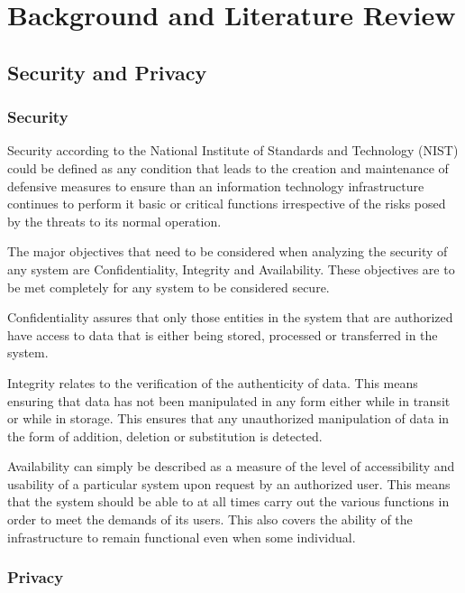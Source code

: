 \chapter{Background and Literature Review}
\label{chap:background_literature_review}

\section{Security and Privacy}

\subsection{Security}
Security according to the National Institute of Standards and Technology (NIST) \cite{Kissel2013} could be defined as any condition that leads to the creation and maintenance of defensive measures to ensure than an information technology infrastructure continues to perform it basic or critical functions irrespective of the risks posed by the threats to its normal operation.

The major objectives that need to be considered when analyzing the security of any system are Confidentiality, Integrity and Availability. These objectives are to be met completely for any system to be considered secure.

Confidentiality \cite{Kissel2013} assures that only those entities in the system that are authorized have access to data that is either being stored, processed or transferred in the system.

Integrity \cite{Kissel2013} relates to the verification of the authenticity of data. This means ensuring that data has not been manipulated in any form either while in transit or while in storage. This ensures that any unauthorized manipulation of data in the form of addition, deletion or substitution is detected.

Availability \cite{Kissel2013} can simply be described as a measure of the level of accessibility and usability of a particular system upon request by an authorized user. This means that the system should be able to at all times carry out the various functions in order to meet the demands of its users. This also covers the ability of the infrastructure to remain functional even when some individual.

\subsection{Privacy}

